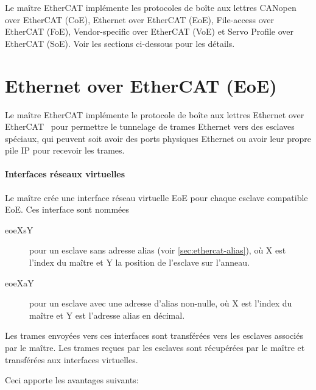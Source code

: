\documentclass[a4paper,12pt,BCOR=6mm,bibtotoc,idxtotoc]{scrbook}
\begin{document}

Le ma\^itre EtherCAT impl\'emente les protocoles de bo\^ite aux
lettres CANopen over EtherCAT (CoE), Ethernet over EtherCAT (EoE),
File-access over EtherCAT (FoE), Vendor-specific over EtherCAT (VoE)
et Servo Profile over EtherCAT (SoE).  Voir les sections ci-dessous
pour les d\'etails.


\section{Ethernet over EtherCAT (EoE)}
\label{sec:eoe}

Le ma\^itre EtherCAT impl\'emente le protocole de bo\^ite aux lettres
Ethernet over EtherCAT~\cite[sec.~5.7]{alspec} pour permettre le
tunnelage de trames Ethernet vers des esclaves sp\'eciaux, qui peuvent
soit avoir des ports physiques Ethernet ou avoir leur propre pile IP
pour recevoir les trames.

\paragraph{Interfaces r\'eseaux virtuelles}

Le ma\^itre cr\'ee une interface r\'eseau virtuelle EoE pour chaque
esclave compatible EoE. Ces interface sont nomm\'ees

\begin{description}

\item[eoeXsY] pour un esclave sans adresse alias (voir
  \autoref{sec:ethercat-alias}), o\`u X est l'index du ma\^itre et Y
  la position de l'esclave sur l'anneau.

\item[eoeXaY] pour un esclave avec une adresse d'alias non-nulle, o\`u
  X est l'index du ma\^itre et Y est l'adresse alias en d\'ecimal.

\end{description}

Les trames envoy\'ees vers ces interfaces sont transf\'er\'ees vers les
esclaves associ\'es par le ma\^itre. Les trames re\c{c}ues par les esclaves
sont r\'ecup\'er\'ees par le ma\^itre et transf\'er\'ees aux interfaces
virtuelles.

Ceci apporte les avantages suivants:
\end{document}
